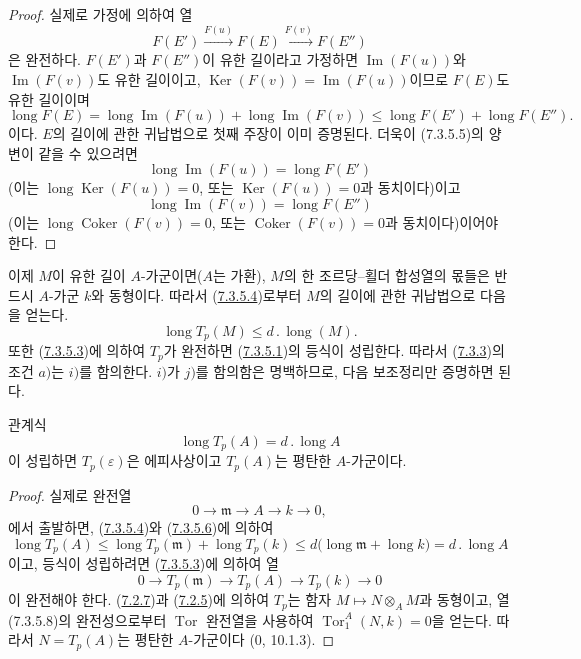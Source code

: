\begin{proof}
실제로 가정에 의하여 열
\[
  F(E')\xrightarrow{F(u)}F(E)\xrightarrow{F(v)}F(E'')
\]
은 완전하다. $F(E')$과 $F(E'')$이 유한 길이라고 가정하면
$\operatorname{Im}(F(u))$와 $\operatorname{Im}(F(v))$도 유한 길이이고,
$\operatorname{Ker}(F(v))=\operatorname{Im}(F(u))$이므로 $F(E)$도
유한 길이이며
\[
  \operatorname{long}F(E)
  =
  \operatorname{long}\operatorname{Im}(F(u))
  +
  \operatorname{long}\operatorname{Im}(F(v))
  \leq
  \operatorname{long}F(E')+\operatorname{long}F(E'').
  \tag{7.3.5.5}\label{III.7.3.5.5.fr}
\]
이다.
$E$의 길이에 관한 귀납법으로 첫째 주장이 이미 증명된다. 더욱이
(7.3.5.5)의 양변이 같을 수 있으려면
\[
  \operatorname{long}\operatorname{Im}(F(u))=\operatorname{long}F(E')
\]
(이는 $\operatorname{long}\operatorname{Ker}(F(u))=0$, 또는
$\operatorname{Ker}(F(u))=0$과 동치이다)이고
\[
  \operatorname{long}\operatorname{Im}(F(v))=\operatorname{long}F(E'')
\]
(이는 $\operatorname{long}\operatorname{Coker}(F(v))=0$, 또는
$\operatorname{Coker}(F(v))=0$과 동치이다)이어야 한다.
\end{proof}

이제 $M$이 유한 길이 $A$-가군이면($A$는 가환), $M$의 한
조르당--횔더 합성열의 몫들은 반드시 $A$-가군 $k$와 동형이다. 따라서
(\hyperref[III.7.3.5.4.fr]{7.3.5.4})로부터 $M$의 길이에 관한 귀납법으로
다음을 얻는다.
\[
  \operatorname{long}T_p(M)\leq d\mathbin{.}\operatorname{long}(M).
  \tag{7.3.5.6}\label{III.7.3.5.6.fr}
\]
또한 (\hyperref[III.7.3.5.3-fr]{7.3.5.3})에 의하여 $T_p$가 완전하면
(\hyperref[III.7.3.5.1.fr]{7.3.5.1})의 등식이 성립한다. 따라서
(\hyperref[III.7.3.3-fr]{7.3.3})의 조건 $a)$는 $i)$를 함의한다.
$i)$가 $j)$를 함의함은 명백하므로, 다음 보조정리만 증명하면 된다.

\begin{lemma}[7.3.5.7]
\label{III.7.3.5.7-fr}
관계식
\[
  \operatorname{long}T_p(A)=d\mathbin{.}\operatorname{long}A
\]
이 성립하면 $T_p(\varepsilon)$은 에피사상이고 $T_p(A)$는 평탄한
$A$-가군이다.
\end{lemma}

\begin{proof}
실제로 완전열
\[
  0\longrightarrow\mathfrak m\longrightarrow A\longrightarrow k
  \longrightarrow0,
\]
에서 출발하면, (\hyperref[III.7.3.5.4.fr]{7.3.5.4})와
(\hyperref[III.7.3.5.6.fr]{7.3.5.6})에 의하여
\[
  \operatorname{long}T_p(A)
  \leq
  \operatorname{long}T_p(\mathfrak m)+\operatorname{long}T_p(k)
  \leq
  d\bigl(\operatorname{long}\mathfrak m+\operatorname{long}k\bigr)
  =d\mathbin{.}\operatorname{long}A
\]
이고, 등식이 성립하려면 (\hyperref[III.7.3.5.3-fr]{7.3.5.3})에 의하여
열
\[
  0\longrightarrow T_p(\mathfrak m)\longrightarrow T_p(A)
  \longrightarrow T_p(k)\longrightarrow0
  \tag{7.3.5.8}\label{III.7.3.5.8.fr}
\]
이 완전해야 한다. (\hyperref[III.7.2.7-fr]{7.2.7})과
(\hyperref[III.7.2.5-fr]{7.2.5})에 의하여 $T_p$는 함자
$M\mapsto N\otimes_A M$과 동형이고, 열 (7.3.5.8)의 완전성으로부터
$\operatorname{Tor}$ 완전열을 사용하여
$\operatorname{Tor}_1^A(N,k)=0$을 얻는다. 따라서
$N=T_p(A)$는 평탄한 $A$-가군이다 (0, 10.1.3).
\end{proof}

